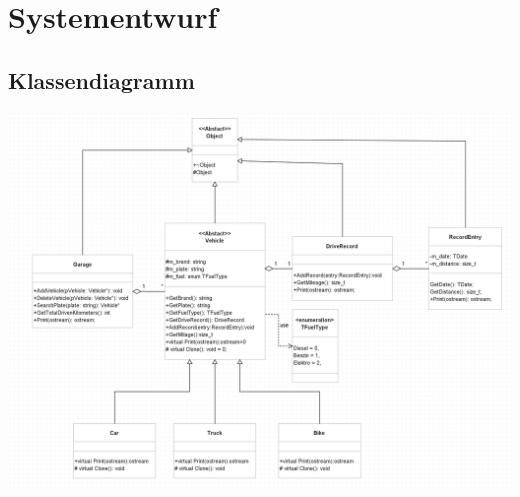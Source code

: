 \documentclass[12pt,naustrian,a4widepaper]{scrartcl}
\begin{document}
\clearpage
\section{Systementwurf}

\subsection{Klassendiagramm}
\includegraphics[width=14cm]{./Images/Klassendiagramm.png}
\newpage
\end{document}

